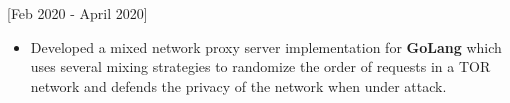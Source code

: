 \documentclass{article}
\begin{document}
 [\normalfont{}Feb 2020 - April 2020]
\begin{itemize}
    \item Developed a mixed network proxy server implementation for \textbf{GoLang} which uses several mixing strategies 
    to randomize the order of requests in a TOR network and defends the privacy of the network when under attack.
\end{itemize} 
\end{document}
